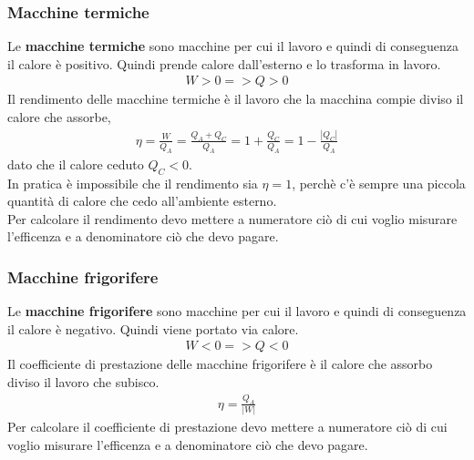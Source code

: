             \subsubsection{Macchine termiche}
                Le \textbf{macchine termiche} sono macchine per cui il lavoro e quindi di conseguenza il calore è positivo. Quindi prende calore dall'esterno e lo trasforma in lavoro.
                \begin{align*}
                    W > 0 => Q > 0
                \end{align*}
                Il rendimento delle macchine termiche è il lavoro che la macchina compie diviso il calore che assorbe,
                \begin{align*}
                    \eta = \frac{W}{Q_A} = \frac{Q_A + Q_C}{Q_A} = 1 + \frac{Q_C}{Q_A} = 1 - \frac{|Q_C|}{Q_A}
                \end{align*}
                dato che il calore ceduto $Q_C < 0$.\\
                In pratica è impossibile che il rendimento sia $\eta=1$, perchè c'è sempre una piccola quantità di calore che cedo all'ambiente esterno.\\
                Per calcolare il rendimento devo mettere a numeratore ciò di cui voglio misurare l'efficenza e a denominatore ciò che devo pagare.

            \subsubsection{Macchine frigorifere}
                Le \textbf{macchine frigorifere} sono macchine per cui il lavoro e quindi di conseguenza il calore è negativo. Quindi viene portato via calore.
                \begin{align*}
                    W < 0 => Q < 0
                \end{align*}
                Il coefficiente di prestazione delle macchine frigorifere è il calore che assorbo diviso il lavoro che subisco.
                \begin{align*}
                    \eta = \frac{Q_A}{|W|}
                \end{align*}
                Per calcolare il coefficiente di prestazione devo mettere a numeratore ciò di cui voglio misurare l'efficenza e a denominatore ciò che devo pagare.

